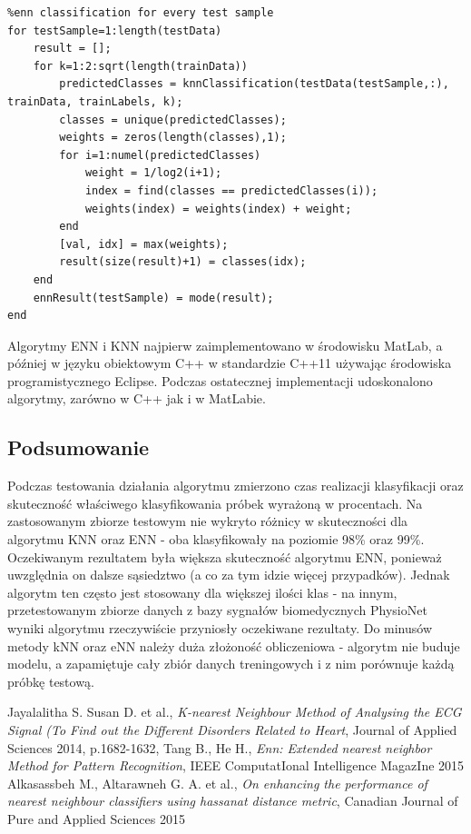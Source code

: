 \documentclass[[10pt,a4paper]{article}
\begin{document}
\begin{lstlisting}
%enn classification for every test sample
for testSample=1:length(testData)
    result = [];
    for k=1:2:sqrt(length(trainData))
        predictedClasses = knnClassification(testData(testSample,:), trainData, trainLabels, k);
        classes = unique(predictedClasses);
        weights = zeros(length(classes),1);
        for i=1:numel(predictedClasses)
            weight = 1/log2(i+1);
            index = find(classes == predictedClasses(i));
            weights(index) = weights(index) + weight;
        end
        [val, idx] = max(weights);
        result(size(result)+1) = classes(idx);
    end
    ennResult(testSample) = mode(result);
end
\end{lstlisting}

Algorytmy ENN i KNN najpierw zaimplementowano w środowisku MatLab, a później w języku obiektowym C++ w standardzie C++11 używając środowiska programistycznego Eclipse. Podczas ostatecznej implementacji udoskonalono algorytmy, zarówno w C++ jak i w MatLabie.


\subsection{Podsumowanie}
Podczas testowania działania algorytmu zmierzono czas realizacji klasyfikacji oraz skuteczność właściwego klasyfikowania próbek wyrażoną w procentach. Na zastosowanym zbiorze testowym nie wykryto różnicy w skuteczności dla algorytmu KNN oraz ENN - oba klasyfikowały na poziomie 98\% oraz 99\%. Oczekiwanym rezultatem była większa skuteczność algorytmu ENN, ponieważ uwzględnia on dalsze sąsiedztwo (a co za tym idzie więcej przypadków). Jednak algorytm ten często jest stosowany dla większej ilości klas - na innym, przetestowanym zbiorze danych z bazy sygnałów biomedycznych PhysioNet wyniki algorytmu rzeczywiście przyniosły oczekiwane rezultaty. Do minusów metody kNN oraz eNN należy duża złożoność obliczeniowa - algorytm nie buduje modelu, a zapamiętuje cały zbiór danych treningowych i z nim porównuje każdą próbkę testową.

\begin{thebibliography}{99}
 Jayalalitha S. Susan D. et al., \emph{K-nearest Neighbour Method of Analysing the ECG Signal (To Find out the Different Disorders Related to Heart}, Journal of Applied Sciences 2014, p.1682-1632, 
 Tang B., He H., \emph{Enn: Extended nearest neighbor Method for Pattern Recognition}, IEEE ComputatIonal Intelligence MagazIne 2015
 Alkasassbeh M., Altarawneh G. A. et al., \emph{On enhancing the performance of nearest neighbour classifiers using hassanat distance metric}, Canadian Journal of Pure and Applied Sciences 2015
\end{thebibliography}
\end{document}
